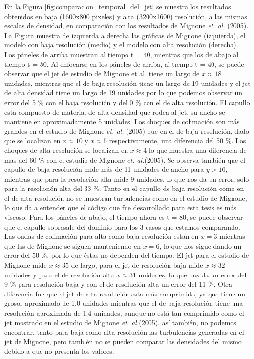 \documentclass[12pt,a4paper]{book}
\begin{document}
En la Figura \ref{fig:comparacion_temporal_del_jet} se muestra los resultados obtenidos en baja 
(1600x800 pixeles) y alta (3200x1600) resolución, a 
las mismas escalas de densidad, en comparación con los resultados de Mignone \emph{et. al.} (2005).
La Figura muestra de izquierda a derecha las gráficas de Mignone (izquierda), el modelo con baja resolución 
(medio) y el modelo con alta resolución (derecha). Los páneles de arriba muestran al tiempo t = 40, mientras que los 
de abajo al tiempo t = 80.
Al enfocarse en los páneles de arriba, al tiempo t = 40, se puede observar que el jet de estudio de Mignone et al. tiene un largo 
de $x \approx 18$ unidades, mientras que el de baja resolución tiene un largo de 19 unidades y 
el jet de alta densidad  tiene un largo de 19 unidades por lo que podemos observar un error del 5 \% 
con el baja resolución y del 0 \% con el de alta resolución. El capullo esta compuesto de material de alta densidad 
que rodea al jet, su ancho se mantiene en aproximadamente 5 unidades.
Los choques de colimación son más grandes en el estudio de Mignone \emph{et. al.} (2005)
que en el de baja resolución, 
dado que se localizan en $x \approx 10$ y $x \approx 5$ respectivamente, una diferencia del 50 \%. 
Los choques de alta resolución se localizan en $x \approx 4$  lo que muestra una diferencia de mas del 
60 \% con el estudio de Mignone \emph{et. al.}(2005).
Se observa también que el capullo de baja resolución mide más de 11 unidades de ancho para $y > 10$, 
mientras que para la resolución alta mide 9 unidades, lo que nos da un error, solo para la resolución alta del 33 \%.
Tanto en el capullo de baja resolución como en el de alta resolución no se muestran turbulencias 
como en el estudio de Mignone, lo que da a entender  que el código que fue desarrollado para esta tesis 
es más viscoso.
Para los páneles de abajo, el tiempo ahora es t = 80, se puede observar que el capullo sobresale del dominio para los 
3 casos que estamos comparando. Las ondas de colimación para alta como baja resolución
estan en $x = 3$ mientras que las de Mignone se siguen manteniendo en $x = 6$, lo que nos sigue dando un error 
del 50 \%, por lo que éstas no dependen del tiempo. 
El jet para el estudio de Mignone mide $x \approx 35$ de largo, para el jet de resolución baja mide $x \approx 32$ unidades y 
para el de resolución alta $x \approx 31$ unidades, lo que nos da un error del 9 \% para resolución baja y con el 
de resolución alta un error del 11 \%.
Otra diferencia fue que el jet de 
alta resolución esta más comprimido, ya que tiene un grosor aproximado de 1.0 unidades 
mientras que el de baja resolución tiene una resolución aproximada de 1.4 unidades, 
aunque no está tan comprimido como el jet mostrado en el estudio de Mignone \emph{et. al.}(2005). así también, no podemos encontrar, tanto para baja como 
alta resolución las turbulencias generadas en el jet de Mignone, pero también no se pueden comparar las densidades del 
mismo debido a que no presenta los valores.
\end{document}
